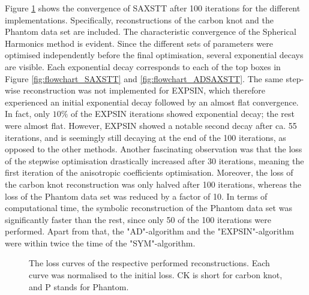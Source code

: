 Figure \ref{fig:Loss_curve_optimal} shows the convergence of SAXSTT after 100 iterations for the different implementations.
Specifically, reconstructions of the carbon knot and the Phantom data set are included.
The characteristic convergence of the Spherical Harmonics method is evident.
Since the different sets of parameters were optimised independently before the final optimisation, several exponential decays are visible.
Each exponential decay corresponds to each of the top boxes in Figure \ref{fig:flowchart_SAXSTT} and \ref{fig:flowchart_ADSAXSTT}.
The same step-wise reconstruction was not implemented for EXPSIN, which therefore experienced an initial exponential decay followed by an almost flat convergence.
In fact, only $10\%$ of the EXPSIN iterations showed exponential decay; the rest were almost flat.
However, EXPSIN showed a notable second decay after ca. 55 iterations, and is seemingly still decaying at the end of the 100 iterations, as opposed to the other methods.
Another fascinating observation was that the loss of the stepwise optimisation drastically increased after 30 iterations, meaning the first iteration of the anisotropic coefficients optimisation.
Moreover, the loss of the carbon knot reconstruction was only halved after 100 iterations, whereas the loss of the Phantom data set was reduced by a factor of 10.
In terms of computational time, the symbolic reconstruction of the Phantom data set was significantly faster than the rest, since only 50 of the 100 iterations were performed.
Apart from that, the "AD"-algorithm and the "EXPSIN"-algorithm were within twice the time of the "SYM"-algorithm.



\begin{figure}[h!]
    \centering
    \caption[Loss Curves of Reconstructions]{ The loss curves of the respective performed reconstructions. Each curve was normalised to the initial loss.
        CK is short for carbon knot, and P stands for Phantom. }
    \label{fig:Loss_curve_optimal}
\end{figure}